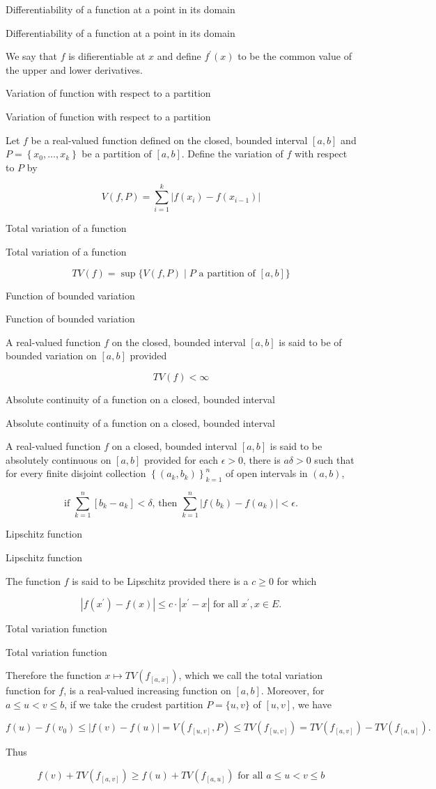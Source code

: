 \documentclass[17pt]{extarticle}
\newcommand{\boxset}[2]{\begin{mdframed}[style=darkQuesion]
#1
\end{mdframed}
\newpage
\begin{mdframed}[style=darkQuesion]
#1
  \end{mdframed}
\begin{mdframed}[style=darkAnswer]
#2
  \end{mdframed}
  \newpage
}
\begin{document}
\boxset{Differentiability of a function at a point in its domain}
{
We say that $f$ is difierentiable at $x$ and define $f^{\prime}(x)$ to be the common value of the upper and lower derivatives.
}
\boxset{Variation of function with respect to a partition}
{
Let $f$ be a real-valued function defined on the closed, bounded interval $[a, b]$ and $P=\left\{x_{0}, \ldots, x_{k}\right\}$ be a partition of $[a, b]$. Define the variation of $f$ with respect to $P$ by

\[
V(f, P)=\sum_{i=1}^{k}\left|f\left(x_{i}\right)-f\left(x_{i-1}\right)\right|
\]

}
\boxset{Total variation of a function}
{
\[T V(f)=\sup \{V(f, P) \mid P \text { a partition of }[a, b]\}\]
}
\boxset{Function of bounded variation}
{
A real-valued function $f$ on the closed, bounded interval $[a, b]$ is said to be of bounded variation on $[a, b]$ provided

\[
T V(f)<\infty
\]

}
\boxset{Absolute continuity of a function on a closed, bounded interval}
{
A real-valued function $f$ on a closed, bounded interval $[a, b]$ is said to be absolutely continuous on $[a, b]$ provided for each $\epsilon>0$, there is $a \delta>0$ such that for every finite disjoint collection $\left\{\left(a_{k}, b_{k}\right)\right\}_{k=1}^{n}$ of open intervals in $(a, b)$,

\[
\text { if } \sum_{k=1}^{n}\left[b_{k}-a_{k}\right]<\delta \text {, then } \sum_{k=1}^{n}\left|f\left(b_{k}\right)-f\left(a_{k}\right)\right|<\epsilon \text {. }
\]

}
\boxset{Lipschitz function}
{
The function $f$ is said to be Lipschitz provided there is a $c \geq 0$ for which

\[
\left|f\left(x^{\prime}\right)-f(x)\right| \leq c \cdot\left|x^{\prime}-x\right| \text { for all } x^{\prime}, x \in E .
\]

}
\boxset{Total variation function}
{
Therefore the function $x \mapsto T V\left(f_{[a, x]}\right)$, which we call the total variation function for $f$, is a real-valued increasing function on $[a, b]$. Moreover, for $a \leq u<v \leq b$, if we take the crudest partition $P=\{u, v\}$ of $[u, v]$, we have

\[
f(u)-f\left(v_{0}\right) \leq|f(v)-f(u)|=V\left(f_{[u, v]}, P\right) \leq T V\left(f_{[u, v]}\right)=T V\left(f_{[a, v]}\right)-T V\left(f_{[a, u]}\right) .
\]

Thus

\[
f(v)+T V\left(f_{[a, v]}\right) \geq f(u)+T V\left(f_{[a, u]}\right) \text { for all } a \leq u<v \leq b
\]

}
\end{document}
